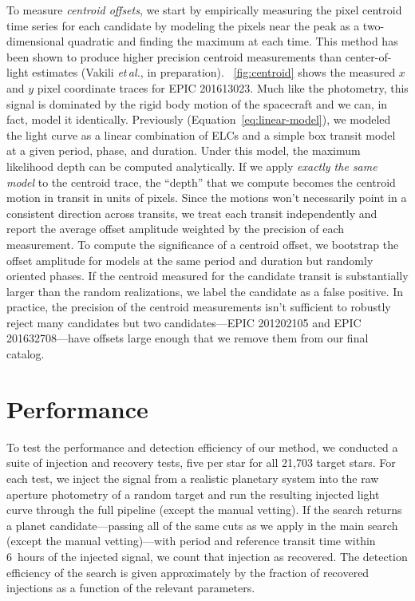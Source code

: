\documentclass[12pt,preprint]{aastex}
\newcommand{\foreign}[1]{\emph{#1}}
\newcommand{\etal}{\foreign{et\,al.}}
\newcommand{\figref}[1]{\ref{fig:#1}}
\newcommand{\Fig}[1]{\figurename~\figref{#1}}
\newcommand{\eqalt}[1]{Equation~\ref{eq:#1}}
\newcommand{\sectlabel}[1]{\label{sect:#1}}
\begin{document}
To measure \emph{centroid offsets}, we start by empirically measuring the
pixel centroid time series for each candidate by modeling the pixels near the
peak as a two-dimensional quadratic and finding the maximum at each time.
This method has been shown to produce higher precision centroid measurements
than center-of-light estimates (Vakili \etal, in preparation).
\Fig{centroid} shows the measured $x$ and $y$ pixel coordinate traces for EPIC
201613023.
Much like the photometry, this signal is dominated by the rigid body motion
of the spacecraft and we can, in fact, model it identically.
Previously (\eqalt{linear-model}), we modeled the light curve as a linear
combination of ELCs and a simple box transit model at a given period, phase,
and duration.
Under this model, the maximum likelihood depth can be computed analytically.
If we apply \emph{exactly the same model} to the centroid trace, the ``depth''
that we compute becomes the centroid motion in transit in units of pixels.
Since the motions won't necessarily point in a consistent direction across
transits, we treat each transit independently and report the average offset
amplitude weighted by the precision of each measurement.
To compute the significance of a centroid offset, we bootstrap the offset
amplitude for models at the same period and duration but randomly oriented
phases.
If the centroid measured for the candidate transit is substantially larger
than the random realizations, we label the candidate as a false positive.
In practice, the precision of the centroid measurements isn't sufficient to
robustly reject many candidates but two candidates---EPIC 201202105 and EPIC
201632708---have offsets large enough that we remove them from our final
catalog.


\section{Performance}
\sectlabel{perform}

To test the performance and detection efficiency of our method, we conducted a
suite of injection and recovery tests, five per
star for all 21,703 target stars.
For each test, we inject the signal from a realistic planetary system into the
raw aperture photometry of a random target and run the resulting injected
light curve through the full pipeline (except the manual vetting).
If the search returns a planet candidate---passing all of the same cuts as we
apply in the main search (except the manual vetting)---with period and
reference transit time within 6~hours of the injected signal, we count that
injection as recovered.
The detection efficiency of the search is given approximately by the fraction
of recovered injections as a function of the relevant parameters.
\end{document}
